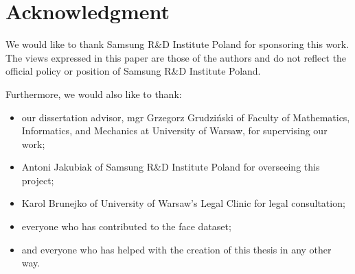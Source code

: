 \section*{Acknowledgment}
We would like to thank Samsung R\&D Institute Poland for sponsoring this work.
The views expressed in this paper are those of the authors and do not reflect
the official policy or position of Samsung R\&D Institute Poland.

\bigskip \noindent
Furthermore, we would also like to thank:
\begin{itemize}
    \item our dissertation advisor,  mgr Grzegorz Grudziński of Faculty of Mathematics,
          Informatics, and Mechanics at University of Warsaw, for supervising our work;
    \item Antoni Jakubiak of Samsung R\&D Institute Poland for overseeing this project;
    \item Karol Brunejko of University of Warsaw's Legal Clinic for legal consultation;
    \item everyone who has contributed to the face dataset;
    \item and everyone who has helped with the creation of this thesis in any other way.
\end{itemize}

